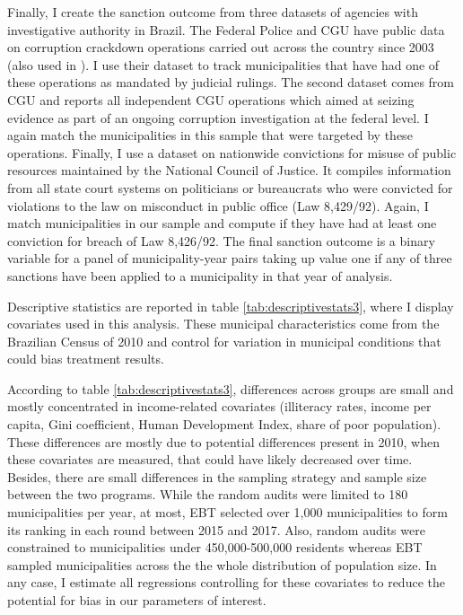 \documentclass[11pt]{article}
\begin{document}
Finally, I create the sanction outcome from three datasets of agencies with investigative authority in Brazil. The Federal Police and CGU have public data on corruption crackdown operations carried out across the country since 2003 (also used in \citet{AvisGovernmentAuditsReduce2018}). I use their dataset to track municipalities that have had one of these operations as mandated by judicial rulings. The second dataset comes from CGU and reports all independent CGU operations which aimed at seizing evidence as part of an ongoing corruption investigation at the federal level. I again match the municipalities in this sample that were targeted by these operations. Finally, I use a dataset on nationwide convictions for misuse of public resources maintained by the National Council of Justice. It compiles information from all state court systems on politicians or bureaucrats who were convicted for violations to the law on misconduct in public office (Law 8,429/92). Again, I match municipalities in our sample and compute if they have had at least one conviction for breach of Law 8,426/92. The final sanction outcome is a binary variable for a panel of municipality-year pairs taking up value one if any of three sanctions have been applied to a municipality in that year of analysis.

Descriptive statistics are reported in table \ref{tab:descriptivestats3}, where I display covariates used in this analysis. These municipal characteristics come from the Brazilian Census of 2010 and control for variation in municipal conditions that could bias treatment results.



According to table \ref{tab:descriptivestats3}, differences across groups are small and mostly concentrated in income-related covariates (illiteracy rates, income per capita, Gini coefficient, Human Development Index, share of poor population). These differences are mostly due to potential differences present in 2010, when these covariates are measured, that could have likely decreased over time. Besides, there are small differences in the sampling strategy and sample size between the two programs. While the random audits were limited to 180 municipalities per year, at most, EBT selected over 1,000 municipalities to form its ranking in each round between 2015 and 2017. Also, random audits were constrained to municipalities under 450,000-500,000 residents whereas EBT sampled municipalities across the the whole distribution of population size. In any case, I estimate all regressions controlling for these covariates to reduce the potential for bias in our parameters of interest.
\end{document}
